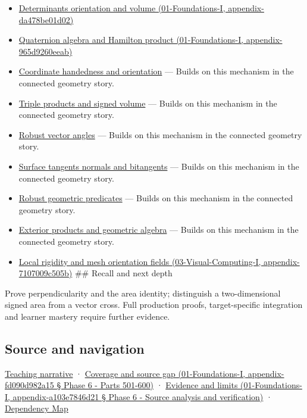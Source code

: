 \begin{itemize}
\item
  \href{}{Determinants orientation and volume (01-Foundations-I, appendix-da478be01d02)}
\item
  \href{}{Quaternion algebra and Hamilton product (01-Foundations-I, appendix-965d9260eeab)}
\item
  \hyperref[appendix-87d7626c8d37]{Coordinate handedness and orientation} --- Builds on this mechanism in the connected geometry story.
\item
  \hyperref[appendix-5caa058bd9c7]{Triple products and signed volume} --- Builds on this mechanism in the connected geometry story.
\item
  \hyperref[appendix-e569e60e18e6]{Robust vector angles} --- Builds on this mechanism in the connected geometry story.
\item
  \hyperref[appendix-e31893dec985]{Surface tangents normals and bitangents} --- Builds on this mechanism in the connected geometry story.
\item
  \hyperref[appendix-341296fb3f64]{Robust geometric predicates} --- Builds on this mechanism in the connected geometry story.
\item
  \hyperref[appendix-e1960925d1b8]{Exterior products and geometric algebra} --- Builds on this mechanism in the connected geometry story.
\item
  \href{}{Local rigidity and mesh orientation fields (03-Visual-Computing-I, appendix-7107009c505b)} \#\# Recall and next depth
\end{itemize}

Prove perpendicularity and the area identity; distinguish a two-dimensional signed area from a vector cross. Full production proofs, target-specific integration and learner mastery require further evidence.

\subsection{Source and navigation}\label{source-and-navigation}

\href{Continuous\%20Notes/Computing\%20Foundations\%20-\%20From\%20Bits\%20to\%20C++\%20and\%20Systems\%20APIs\#Oriented\%20area\%20tells\%20us\%20which\%20side\%20of\%20the\%20panel\%20is\%20front}{Teaching narrative} · \href{}{Coverage and source gap (01-Foundations-I, appendix-fd090d982a15 § Phase 6 - Parts 501-600)} · \href{}{Evidence and limits (01-Foundations-I, appendix-a103e7846d21 § Phase 6 - Source analysis and verification)} · \hyperref[appendix-4ad47bdd269a]{Dependency Map}
